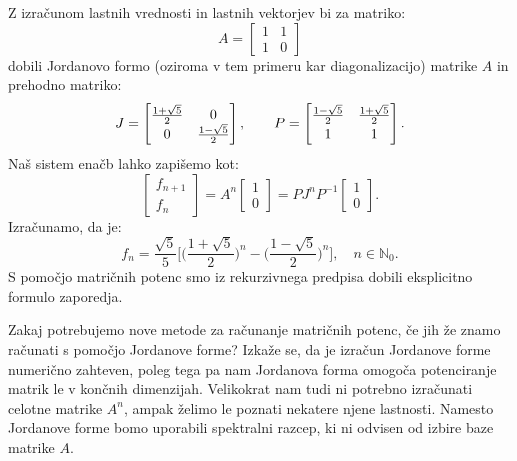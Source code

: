 \documentclass[mat1]{fmfdelo}
\newcommand{\N}{\mathbb N}
\begin{document}
\begin{zgled} 
    Z izračunom lastnih vrednosti in lastnih vektorjev bi za matriko:
    \begin{equation*}
        A = 
        \begin{bmatrix}
            1 & 1 \\
            1 & 0
        \end{bmatrix}
    \end{equation*}
    dobili Jordanovo formo (oziroma v tem primeru kar diagonalizacijo) matrike $A$ in prehodno matriko:
    \begin{equation*}
        J = 
        \begin{bmatrix}
                \frac{1+\sqrt{5}}{2} & 0 \\
            0 &  \frac{1-\sqrt{5}}{2}
        \end{bmatrix}
        ,\quad \quad
        P = 
        \begin{bmatrix}
            \frac{1-\sqrt{5}}{2} &  \frac{1+\sqrt{5}}{2} \vspace{2pt} \\
            1 & 1
        \end{bmatrix}.
    \end{equation*}
    Naš sistem enačb lahko zapišemo kot:
    \begin{equation*}
        \begin{bmatrix}
            f_{n+1} \\
            f_n
        \end{bmatrix}
        =
        A^n
        \begin{bmatrix}
            1 \\
            0
        \end{bmatrix}
        = PJ^n P^{-1}
        \begin{bmatrix}
            1 \\
            0
        \end{bmatrix}.
    \end{equation*}
    Izračunamo, da je:
    \begin{equation*}
        f_n = \frac{\sqrt{5}}{5}\Big[ \Big(\frac{1+\sqrt{5}}{2}\Big)^n - \Big(\frac{1-\sqrt{5}}{2}\Big)^n \Big], \quad n \in \N_0.
    \end{equation*}
    S pomočjo matričnih potenc smo iz rekurzivnega predpisa dobili eksplicitno formulo zaporedja.
\end{zgled}

Zakaj potrebujemo nove metode za računanje matričnih potenc, če jih že znamo računati s pomočjo Jordanove forme? Izkaže se, da je izračun Jordanove forme numerično zahteven, poleg tega pa nam Jordanova forma omogoča potenciranje matrik le v končnih dimenzijah. Velikokrat nam tudi ni potrebno izračunati celotne matrike $A^n$, ampak želimo le poznati nekatere njene lastnosti. Namesto Jordanove forme bomo uporabili spektralni razcep, ki ni odvisen od izbire baze matrike $A$.
\end{document}
